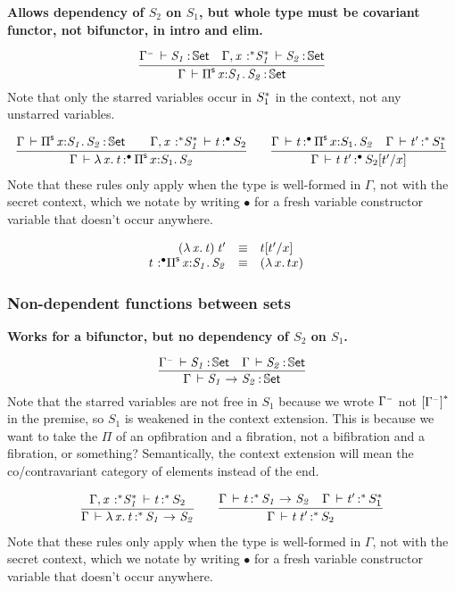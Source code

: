 \documentclass[11pt]{article}
\theoremstyle{plain}
\begin{document}
\textbf{Allows dependency of $S_2$ on $S_1$, but whole type must be
  covariant functor, not bifunctor, in intro and elim.}

\[
\infer{\oftp{\Gamma}{\piset{x}{S_1}{S_2}}{\types}}
      {\oftp{\Gamma^\con}{S_1}{\types} &
        \oftp{\Gamma, \tpvar {x}{\vcond}{S_1^\vcond}}{S_2}{\types}}
\]
Note that only the starred variables occur in $S_1^{{\mathord{*}}}$ in the
context, not any unstarred variables.  

\[
\begin{array}{c}
\infer{\oftpe{\Gamma}{\ulam{x}{t}}{\bullet}{\piset x {S_1} {S_2}}}
      { \ofdtp{\Gamma}{\piset{x}{S_1}{S_2}}{\types} & 
        & \oftpe{\Gamma, \tpvar x {\vcond} {S_1^\vcond} }{t}{\bullet}{S_2}}
\qquad
\infer{\oftpe{\Gamma}{\app t {t'}}{\bullet}{\tsubst {S_2} {{t'}/ x}}}
      {\oftpe{\Gamma}{t}{\bullet}{\piset{x}{S_1}{S_2}} &
        \oftpe{\Gamma}{t'}{\vcond}{S_1^\vcond}}
\end{array}
\]
Note that these rules only apply when the type is well-formed in
$\Gamma$, not with the secret context, which we notate by writing
$\bullet$ for a fresh variable constructor variable that doesn't occur
anywhere.

\[
\begin{array}{rcll}
\mathit{({\lambda\,x.\,t}) \: t'} & \equiv & t [ t' / x ] \\
\mathit{t} \,^{\,}{:}^{\bullet} \mathit{\textnormal{$\Pi$}^{\mathsf{s}}\,x \mathit{:} S_1.\,\mathit{S_2}} & \equiv & {({\lambda\,x.\,t}{x})} &
\end{array} \\
\]

\subsubsection{Non-dependent functions between sets}

\textbf{Works for a bifunctor, but no dependency of $S_2$ on $S_1$.}

\[
\infer{\oftp{\Gamma}{\arr{S_1}{S_2}}{\types}}
      {\oftp{\Gamma^\con}{S_1}{\types} &
        \oftp{\Gamma}{S_2}{\types}}
\]
Note that the starred variables are not free in $S_1$ because we wrote
$\Gamma^{{\text{\tiny $\mathord{-}$}}}$ not $\left[\Gamma^{{\text{\tiny $\mathord{-}$}}}\right]^{{\mathord{*}}}$ in the premise, so $S_1$ is
weakened in the context extension.  This is because we want to take the
$\Pi$ of an opfibration and a fibration, not a bifibration and a
fibration, or something?  Semantically, the context extension will mean
the co/contravariant category of elements instead of the end.  

\[
\begin{array}{c}
\infer{\oftpe{\Gamma}{\ulam{x}{t}}{\vcond}{\arr {S_1} {S_2}}}
      {\oftpe{\Gamma, \tpvar x {\vcond} {S_1^\vcond} }{t}{\vcond}{S_2}}
\qquad
\infer{\oftpe{\Gamma}{\app t {t'}}{\vcond}{{S_2}}}
      {\oftpe{\Gamma}{t}{\vcond}{\arr{S_1}{S_2}} &
        \oftpe{\Gamma}{t'}{\vcond}{S_1^\vcond}}
\end{array}
\]
Note that these rules only apply when the type is well-formed in
$\Gamma$, not with the secret context, which we notate by writing
$\bullet$ for a fresh variable constructor variable that doesn't occur
anywhere.
\end{document}
